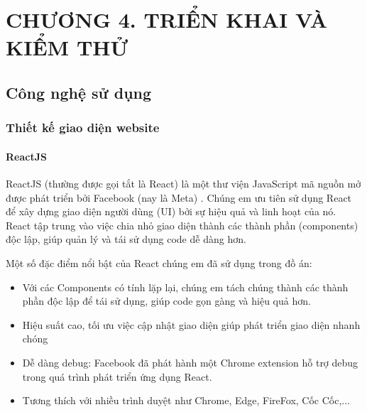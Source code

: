
\section*{CHƯƠNG 4. TRIỂN KHAI VÀ KIỂM THỬ}
\setcounter{section}{4}
\setcounter{subsection}{0} %
\setcounter{table}{0} %
\setcounter{figure}{0} %

\subsection{Công nghệ sử dụng}
\subsubsection{Thiết kế giao diện website}
\paragraph{ReactJS}
\mbox{}

ReactJS (thường được gọi tắt là React) là một thư viện JavaScript mã nguồn mở được phát triển bởi Facebook (nay là Meta) \cite{reactjs}. Chúng em ưu tiên sử dụng React để xây dựng giao diện người dùng (UI) bởi sự hiệu quả và linh hoạt của nó. React tập trung vào việc chia nhỏ giao diện thành các thành phần (components) độc lập, giúp quản lý và tái sử dụng code dễ dàng hơn.

Một số đặc điểm nổi bật của React chúng em đã sử dụng trong đồ án:
\begin{itemize}
	\item Với các Components có tính lặp lại, chúng em tách chúng thành các thành phần độc lập để tái sử dụng, giúp code gọn gàng và hiệu quả hơn.
	\item Hiệu suất cao, tối ưu việc cập nhật giao diện giúp phát triển giao diện nhanh chóng
	\item Dễ dàng debug: Facebook đã phát hành một Chrome extension hỗ trợ debug trong quá trình phát triển ứng dụng React.
	\item Tương thích với nhiều trình duyệt như Chrome, Edge, FireFox, Cốc Cốc,...
\end{itemize}

